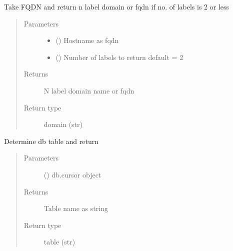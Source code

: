 \documentclass[letterpaper,10pt,english]{sphinxmanual}
\begin{document}
\begin{fulllineitems}
\label{\detokenize{utils:bloxone.utils.get_domain}}
\sphinxAtStartPar
Take FQDN and return n label domain
or fqdn if no. of labels is 2 or less
\begin{quote}\begin{description}
\item[{Parameters}] \leavevmode\begin{itemize}
\item {} 
\sphinxAtStartPar
{} () \textendash{} Hostname as fqdn

\item {} 
\sphinxAtStartPar
{} () \textendash{} Number of labels to return
default = 2

\end{itemize}

\item[{Returns}] \leavevmode
\sphinxAtStartPar
N label domain name or fqdn

\item[{Return type}] \leavevmode
\sphinxAtStartPar
domain (str)

\end{description}\end{quote}

\end{fulllineitems}


\begin{fulllineitems}
\label{\detokenize{utils:bloxone.utils.get_table}}
\sphinxAtStartPar
Determine db table and return
\begin{quote}\begin{description}
\item[{Parameters}] \leavevmode
\sphinxAtStartPar
{} () \textendash{} db.cursor object

\item[{Returns}] \leavevmode
\sphinxAtStartPar
Table name as string

\item[{Return type}] \leavevmode
\sphinxAtStartPar
table (str)

\end{description}\end{quote}

\end{fulllineitems}
\end{document}
